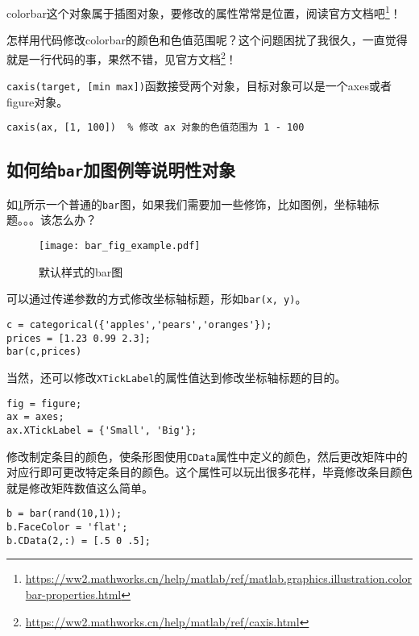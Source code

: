 colorbar这个对象属于插图对象，要修改的属性常常是位置，阅读官方文档吧\footnote{\url{https://ww2.mathworks.cn/help/matlab/ref/matlab.graphics.illustration.colorbar-properties.html}}！

怎样用代码修改colorbar的颜色和色值范围呢？这个问题困扰了我很久，一直觉得就是一行代码的事，果然不错，见官方文档\footnote{\url{https://ww2.mathworks.cn/help/matlab/ref/caxis.html}}！

\texttt{caxis(target, [min max])}函数接受两个对象，目标对象可以是一个axes或者figure对象。

\begin{verbatim}
caxis(ax, [1, 100])  % 修改 ax 对象的色值范围为 1 - 100
\end{verbatim}

\subsection{如何给\texttt{bar}加图例等说明性对象}

如\ref{bar_fig_example}所示一个普通的\texttt{bar}图，如果我们需要加一些修饰，比如图例，坐标轴标题。。。该怎么办？

\begin{figure}
    \centering
    \texttt{[image: bar\_fig\_example.pdf]}
    \caption{默认样式的bar图}
    \label{bar_fig_example}
\end{figure}

可以通过传递参数的方式修改坐标轴标题，形如\texttt{bar(x, y)}。

\begin{verbatim}
c = categorical({'apples','pears','oranges'});
prices = [1.23 0.99 2.3];
bar(c,prices)
\end{verbatim}

当然，还可以修改\texttt{XTickLabel}的属性值达到修改坐标轴标题的目的。

\begin{verbatim}
fig = figure;
ax = axes;
ax.XTickLabel = {'Small', 'Big'};
\end{verbatim}

修改制定条目的颜色，使条形图使用\texttt{CData}属性中定义的颜色，然后更改矩阵中的对应行即可更改特定条目的颜色。这个属性可以玩出很多花样，毕竟修改条目颜色就是修改矩阵数值这么简单。

\begin{verbatim}
b = bar(rand(10,1));
b.FaceColor = 'flat';
b.CData(2,:) = [.5 0 .5];
\end{verbatim}

